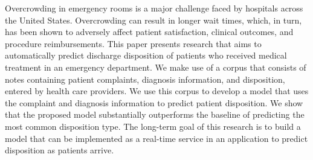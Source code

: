 Overcrowding in emergency rooms is a major challenge faced by hospitals across the United States. Overcrowding can result in longer wait times, which, in turn, has been shown to adversely affect patient satisfaction, clinical outcomes, and procedure reimbursements. This paper presents research that aims to automatically predict discharge disposition of patients who received medical treatment in an emergency department. We make use of a corpus that consists of notes containing patient complaints, diagnosis information, and disposition, entered by health care providers. We use this corpus to develop a model that uses the complaint and diagnosis information to predict patient disposition. We show that the proposed model substantially outperforms the baseline of predicting the most common disposition type. The long-term goal of this research is to build a model that can be implemented as a real-time service in an application to predict disposition as patients arrive.
